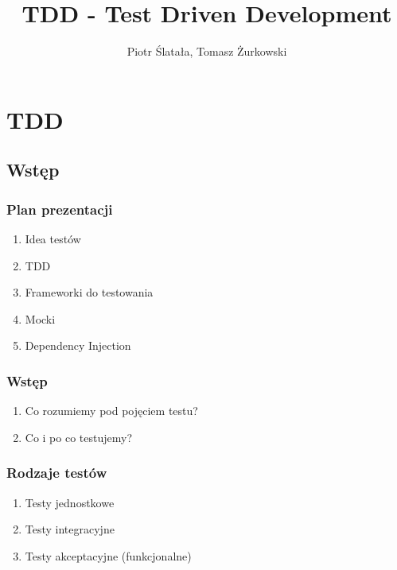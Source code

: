 \documentclass[slidestop,compress,mathserif]{beamer}
\title{TDD - Test Driven Development}
\author{Piotr Ślatała, Tomasz Żurkowski}
\begin{document}
\section{TDD}

\subsection{Wstęp}
\frame{
 \titlepage
}

\begin{frame}
 \frametitle{Plan prezentacji}
 \begin{enumerate}
 \item Idea testów
 \pause \item TDD
 \pause \item Frameworki do testowania
 \pause \item Mocki
 \pause \item Dependency Injection
\end{enumerate}

\end{frame}


\begin{frame}
 \frametitle{Wstęp}
\begin{enumerate}
 \item Co rozumiemy pod pojęciem testu? %
 \pause \item Co i po co testujemy? %
\end{enumerate}
\end{frame}

\begin{frame}
\frametitle{Rodzaje testów}
 \begin{enumerate}
  \item Testy jednostkowe
  \pause \item Testy integracyjne
  \pause \item Testy akceptacyjne (funkcjonalne)
\end{enumerate}
\end{frame}
\end{document}
